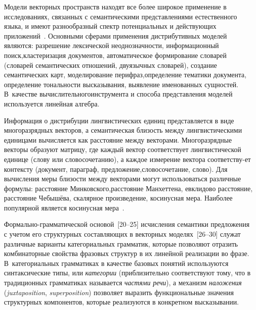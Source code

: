 \begin{multicols}{2}
    \vspace*{-3pt}
    
  Модели векторных пространств находят все \mbox{более} широкое применение в 
исследованиях, связанных с семантическими представлениями естественного 
языка, и имеют разнообразный спектр потенциальных и действующих 
приложений~\cite{9-koz, 8-koz, 19-koz}. Основными сферами применения 
дистрибутивных моделей являются: разрешение лексической 
неод\-но\-значности, информационный \mbox{поиск},\linebreak кластеризация документов, 
автоматическое {формирование} словарей (словарей семантических\linebreak
отношений, двуязычных словарей), создание семантических карт, 
моделирование перифраз,\linebreak определение тематики документа, определение\linebreak 
тональности высказывания, выявление именован\-ных сущностей. В~качестве 
вычислительного\linebreak инструмента и способа представления моделей 
используется линейная алгебра. 

Информация о дистрибуции 
лингвистических единиц представляется в виде многоразрядных векторов, а 
семантическая близость между лингвистическими единицами вычисляется 
как расстояние между векторами. Многоразрядные векторы образуют 
матрицу, где каждый вектор соответствует лингвистической единице (слову 
или словосочетанию), а каждое измерение вектора соответству-\linebreak ет контексту 
(документ, параграф, предложение,\linebreak словосочетание, слово). Для вычисления 
меры бли\-зости между векторами могут использоваться различные формулы: 
расстояние Минковского,\linebreak расстояние Манхеттена, евклидово расстояние, 
расстояние Чебышёва, скалярное произведение, косинусная мера. Наиболее 
популярной является косинусная мера~\cite{9-koz, 8-koz}.
  
  Формально-грамматической основой~[20--25] исчисления семантики 
предложения с учетом его структурных составляющих в векторных 
моделях~[26--30] служат различные варианты категориальных грамматик, 
которые позволяют отразить комбинаторные свойства фразовых структур в 
их линейной реализации во фразе. В~категориальных грамматиках в качестве 
базовых понятий используются синтаксические типы, или \textit{категории} 
(приблизительно соответствуют тому, что в традиционных грамматиках 
называется \textit{частями речи}), а механизм \textit{наложения} 
(\textit{juxtaposition}, \textit{superposition}) позволяет выразить 
функциональные значения структурных компонентов, которые реализуются в 
конкретном высказывании.
  

\end{multicols}
